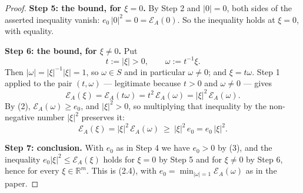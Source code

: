 \begin{proof}
\medskip\noindent\textbf{Step 5: the bound, for $\xi=0$.} By Step 2 and $|0|=0$, both sides
of the asserted inequality vanish: $e_0\,|0|^{2}=0=\mathcal E_A(0)$. So the inequality holds
at $\xi=0$, with equality.

\medskip\noindent\textbf{Step 6: the bound, for $\xi\ne0$.} Put
\[
 t:=|\xi|>0,\qquad \omega:=t^{-1}\xi .
\]
Then $|\omega|=|\xi|^{-1}|\xi|=1$, so $\omega\in S$ and in particular $\omega\ne0$; and
$\xi=t\omega$. Step 1 applied to the pair $(t,\omega)$ — legitimate because $t>0$ and
$\omega\ne0$ — gives
\[
 \mathcal E_A(\xi)=\mathcal E_A(t\omega)=t^{2}\,\mathcal E_A(\omega)=|\xi|^{2}\,\mathcal E_A(\omega).
\]
By (2), $\mathcal E_A(\omega)\ge e_0$, and $|\xi|^{2}>0$, so multiplying that inequality by
the non-negative number $|\xi|^{2}$ preserves it:
\[
 \mathcal E_A(\xi)=|\xi|^{2}\,\mathcal E_A(\omega)\ \ge\ |\xi|^{2}\,e_0=e_0\,|\xi|^{2}.
\]

\medskip\noindent\textbf{Step 7: conclusion.} With $e_0$ as in Step 4 we have $e_0>0$ by
(3), and the inequality $e_0|\xi|^{2}\le\mathcal E_A(\xi)$ holds for $\xi=0$ by Step 5 and
for $\xi\ne0$ by Step 6, hence for every $\xi\in\mathbb R^{m}$. This is (2.4), with
$e_0=\min_{|\omega|=1}\mathcal E_A(\omega)$ as in the paper.
\end{proof}
